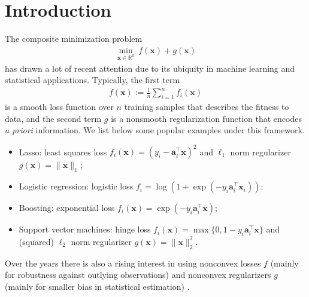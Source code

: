 \documentclass[leqno,onefignum,onetabnum]{siamart0516}
\newcommand{\ab}{\mathbf{a}}
\newcommand{\xb}{\mathbf{x}}
\newcommand{\RR}{\mathds{R}}
\begin{document}
\section{Introduction}\label{sec: intro}
The composite minimization problem
\begin{align}\label{com_min}
\min_{\xb\in \RR^d}~ f(\xb) + g(\xb)
\end{align}
has drawn a lot of recent attention due to its ubiquity in machine learning and statistical applications.
Typically, the first term 
\begin{align}\label{finitesum}
f(\xb) := \frac{1}{n}\sum_{i=1}^n f_i(\xb)
\end{align} 
is a smooth loss function over $n$ training samples that describes the fitness to data, and the second term $g$ is a nonsmooth regularization function that encodes \emph{a priori} information. We list below some popular examples under this framework.
\begin{itemize}[leftmargin=20pt,topsep=3pt,itemsep=3pt]
\item Lasso: least squares loss $f_i(\xb) = (y_i - \ab_i^\top \xb)^2$ and $\ell_1$ norm regularizer $g(\xb) = \|\xb\|_1$;
\item Logistic regression: logistic loss $f_i = \log(1+\exp(-y_i \ab_i^\top \xb_i))$;
\item Boosting: exponential loss $f_i(\xb) = \exp(-y_i \ab_i^\top\xb)$;
\item Support vector machines: hinge loss $f_i(\xb) =\max\{0, 1-y_i\ab_i^\top \xb\}$ and (squared) $\ell_2$ norm regularizer $g(\xb) = \|\xb\|_2^2$.
\end{itemize}
Over the years there is also a rising interest in using nonconvex losses $f$ (mainly for robustness against outlying observations) \cite{Collobert06,WuLiu07,Xuetal06,YuZMX15} and nonconvex regularizers $g$ (mainly for smaller bias in statistical estimation) \cite{FanLi01,ZhangZhang12}.
\end{document}
